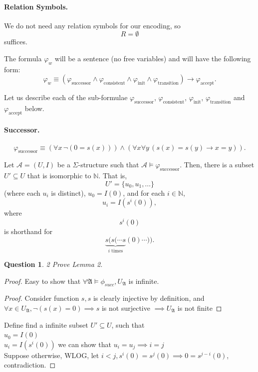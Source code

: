 \documentclass{article}
\newtheorem{question}[theorem]{Question}
\newtheorem{lemma}[theorem]{Lemma}
\let\oldlemma\lemma
\let\endoldlemma\endlemma
\renewenvironment{lemma}
  {\begin{tcolorbox}[
      colback=green!8,
      colframe=green!50!black,
      boxrule=0.6pt,
      arc=2pt,
      left=6pt,right=6pt,top=4pt,bottom=4pt
    ]\oldlemma}
  {\endoldlemma\end{tcolorbox}}
\begin{document}
\paragraph{Relation Symbols.}
We do not need any relation symbols for our encoding, so
\[
R=\emptyset
\]
suffices.

The formula $\varphi_w$ will be a sentence (no free variables) and will have the following form:
\[
\varphi_w \equiv
(\varphi_{\mathrm{successor}} \land \varphi_{\mathrm{consistent}} \land \varphi_{\mathrm{init}} \land \varphi_{\mathrm{transition}})
\to \varphi_{\mathrm{accept}}.
\]

Let us describe each of the sub-formulae $\varphi_{\mathrm{successor}}$, $\varphi_{\mathrm{consistent}}$, $\varphi_{\mathrm{init}}$, $\varphi_{\mathrm{transition}}$ and $\varphi_{\mathrm{accept}}$ below.

\paragraph{Successor.}
\[
\varphi_{\mathrm{successor}} \equiv
\left(\forall x\, \neg(0=s(x))\right)
\land
\left(\forall x \forall y\, (s(x)=s(y) \to x=y)\right).
\]

\begin{lemma}
Let $\mathcal{A}=(U,I)$ be a $\Sigma$-structure such that $\mathcal{A}\models \varphi_{\mathrm{successor}}$. Then, there is a subset $U' \subseteq U$ that is isomorphic to $\mathbb{N}$. That is,
\[
U'=\{u_0,u_1,\dots\}
\]
(where each $u_i$ is distinct), $u_0=I(0)$, and for each $i\in \mathbb{N}$,
\[
u_i = I(s^i(0)),
\]
where
\[
s^i(0)
\]
is shorthand for
\[
\underbrace{s(s(\cdots s}_{i \text{ times}}(0)\cdots)).
\]
\end{lemma}

\begin{question}{2}
Prove Lemma 2.
\end{question}

\begin{proof}
    Easy to show that $\forall \mathfrak{A} \models \phi_{succ}, U_{\mathfrak{A}}$ is infinite. 
    \begin{proof}
        Consider function $s, s$ is clearly injective by definition, and $\forall x \in U_{\mathfrak{A}}, \neg(s(x) = 0) \implies s$ is not surjective
        $\implies U_{\mathfrak{A}}$ is not finite 
    \end{proof}
    Define find a infinite subset $U' \subseteq U$, such that \\
    $u_0 = I(0)$\\
    $u_i = I(s^i(0))$
    we can show that $u_i = u_j\implies i = j$\\
    Suppose otherwise, WLOG, let $i < j, s^i(0) = s^j(0) \implies 0 = s^{j - i}(0)$, contradiction.
\end{proof}
\end{document}
